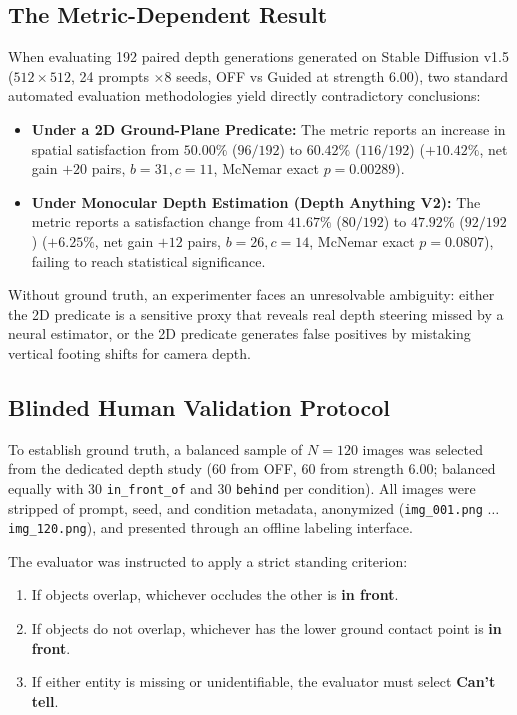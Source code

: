 \documentclass[10pt,twocolumn,letterpaper]{article}
\begin{document}
\subsection{The Metric-Dependent Result}
When evaluating 192 paired depth generations generated on Stable Diffusion v1.5 ($512\times 512$, 24 prompts $\times 8$ seeds, OFF vs Guided at strength 6.00), two standard automated evaluation methodologies yield directly contradictory conclusions:
\begin{itemize}
    \item \textbf{Under a 2D Ground-Plane Predicate:} The metric reports an increase in spatial satisfaction from $50.00\%$ ($96/192$) to $60.42\%$ ($116/192$) ($+10.42\%$, net gain $+20$ pairs, $b=31, c=11$, McNemar exact $p = 0.00289$).
    \item \textbf{Under Monocular Depth Estimation (Depth Anything V2):} The metric reports a satisfaction change from $41.67\%$ ($80/192$) to $47.92\%$ ($92/192$) ($+6.25\%$, net gain $+12$ pairs, $b=26, c=14$, McNemar exact $p = 0.0807$), failing to reach statistical significance.
\end{itemize}

Without ground truth, an experimenter faces an unresolvable ambiguity: either the 2D predicate is a sensitive proxy that reveals real depth steering missed by a neural estimator, or the 2D predicate generates false positives by mistaking vertical footing shifts for camera depth.

\subsection{Blinded Human Validation Protocol}
To establish ground truth, a balanced sample of $N = 120$ images was selected from the dedicated depth study (60 from OFF, 60 from strength 6.00; balanced equally with 30 \texttt{in\_front\_of} and 30 \texttt{behind} per condition). All images were stripped of prompt, seed, and condition metadata, anonymized (\texttt{img\_001.png} $\dots$ \texttt{img\_120.png}), and presented through an offline labeling interface.

The evaluator was instructed to apply a strict standing criterion:
\begin{enumerate}
    \item If objects overlap, whichever occludes the other is \textbf{in front}.
    \item If objects do not overlap, whichever has the lower ground contact point is \textbf{in front}.
    \item If either entity is missing or unidentifiable, the evaluator must select \textbf{Can't tell}.
\end{enumerate}
\end{document}
